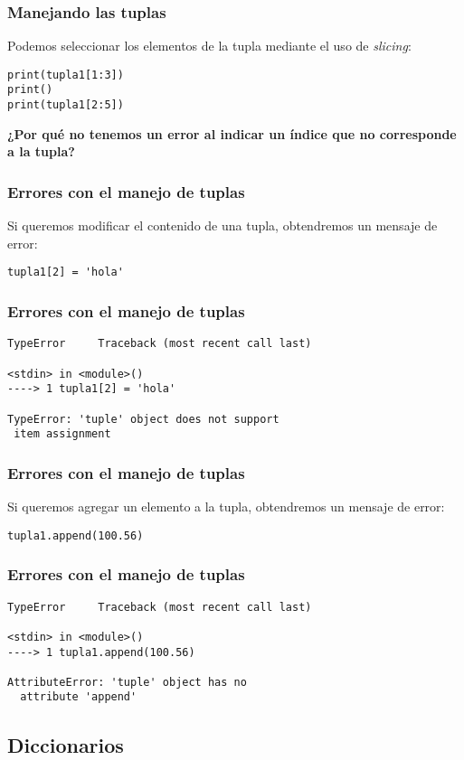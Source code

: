 \documentclass[12pt]{beamer}
\begin{document}
\begin{frame}[fragile]
\frametitle{Manejando las tuplas}
Podemos seleccionar los elementos de la tupla mediante el uso de \emph{slicing}:
\pause
\begin{lstlisting}[caption=Recuperando elementos de una tupla]
print(tupla1[1:3])
print()
print(tupla1[2:5])
\end{lstlisting}
\pause
\textbf{¿Por qué no tenemos un error al indicar un índice que no corresponde a la tupla?}
\end{frame}
\begin{frame}[fragile]
\frametitle{Errores con el manejo de tuplas}
Si queremos modificar el contenido de una tupla, obtendremos un mensaje de error:
\pause
\begin{lstlisting}[caption=Intentando modificar una tupla]
tupla1[2] = 'hola'
\end{lstlisting}
\end{frame}
\begin{frame}[fragile]
\frametitle{Errores con el manejo de tuplas}    
\begingroup
\fontsize{10}{10}\selectfont
\begin{verbatim}
TypeError     Traceback (most recent call last)

<stdin> in <module>()
----> 1 tupla1[2] = 'hola'

TypeError: 'tuple' object does not support
 item assignment
\end{verbatim}
\endgroup
\end{frame}
\begin{frame}[fragile]
\frametitle{Errores con el manejo de tuplas}
Si queremos agregar un elemento a la tupla, obtendremos un mensaje de error:
\pause
\begin{lstlisting}[caption=Intentando agregar un nuevo elemento a la tupla]
tupla1.append(100.56)
\end{lstlisting}
\end{frame}
\begin{frame}[fragile]
\frametitle{Errores con el manejo de tuplas}    
\begingroup
\fontsize{10}{10}\selectfont
\begin{verbatim}
TypeError     Traceback (most recent call last)

<stdin> in <module>()
----> 1 tupla1.append(100.56)

AttributeError: 'tuple' object has no 
  attribute 'append'
\end{verbatim}
\endgroup
\end{frame}

\subsection{Diccionarios}
\end{document}
